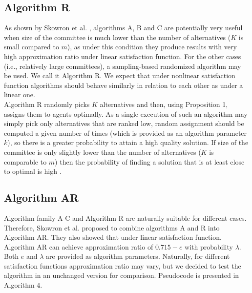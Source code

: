\subsection{Algorithm R}

As shown by Skowron et al. \cite{1}, algorithms A, B and C are potentially very useful when size of the committee is much lower than the number of alternatives ($K$ is small compared to $m$), as under this condition they produce results with very high approximation ratio under linear satisfaction function. For the other cases (i.e., relatively large committees), a sampling-based randomized algorithm may be used. We call it Algorithm R. We expect that under nonlinear satisfaction function algorithms should behave similarly in relation to each other as under a linear one.
\\

Algorithm R randomly picks $K$ alternatives and then, using Proposition 1, assigns them to agents optimally. As a single execution of such an algorithm may simply pick only alternatives that are ranked low, random assignment should be computed a given number of times (which is provided as an algorithm parameter $k$), so there is a greater probability to attain a high quality solution. If size of the committee is only slightly lower than the number of alternatives ($K$ is comparable to $m$) then the probability of finding a solution that is at least close to optimal is high \cite{1}.

\subsection{Algorithm AR}

Algorithm family A-C and Algorithm R are naturally suitable for different cases. Therefore, Skowron et al. \cite{1} proposed to combine algorithms A and R into Algorithm AR. They also showed that under linear satisfaction function, Algorithm AR can achieve approximation ratio of $0.715 - e$ with probability $\lambda$. Both $e$ and $\lambda$ are provided as algorithm parameters. Naturally, for different satisfaction functions approximation ratio may vary, but we decided to test the algorithm in an unchanged version for comparison. Pseudocode is presented in Algorithm 4.

